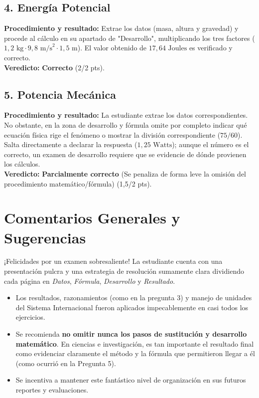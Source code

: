 \documentclass[12pt,letterpaper]{article}
\begin{document}
\subsection*{4. Energía Potencial}
\textbf{Procedimiento y resultado:} Extrae los datos (masa, altura y gravedad) y procede al cálculo en su apartado de "Desarrollo", multiplicando los tres factores ($1,2 \text{ kg} \cdot 9,8 \text{ m/s}^2 \cdot 1,5 \text{ m}$). El valor obtenido de $17,64 \text{ Joules}$ es verificado y correcto. \\
\textbf{Veredicto:} \textbf{Correcto} (2/2 pts).

\subsection*{5. Potencia Mecánica}
\textbf{Procedimiento y resultado:} La estudiante extrae los datos correspondientes. No obstante, en la zona de desarrollo y fórmula omite por completo indicar qué ecuación física rige el fenómeno o mostrar la división correspondiente ($75 / 60$). Salta directamente a declarar la respuesta ($1,25 \text{ Watts}$); aunque el número es el correcto, un examen de desarrollo requiere que se evidencie de dónde provienen los cálculos. \\
\textbf{Veredicto:} \textbf{Parcialmente correcto} (Se penaliza de forma leve la omisión del procedimiento matemático/fórmula) (1,5/2 pts).

\vspace{0.5cm}
\section*{Comentarios Generales y Sugerencias}
¡Felicidades por un examen sobresaliente! La estudiante cuenta con una presentación pulcra y una estrategia de resolución sumamente clara dividiendo cada página en \textit{Datos}, \textit{Fórmula}, \textit{Desarrollo} y \textit{Resultado}.
\begin{itemize}
    \item Los resultados, razonamientos (como en la pregunta 3) y manejo de unidades del Sistema Internacional fueron aplicados impecablemente en casi todos los ejercicios.
    \item Se recomienda \textbf{no omitir nunca los pasos de sustitución y desarrollo matemático}. En ciencias e investigación, es tan importante el resultado final como evidenciar claramente el método y la fórmula que permitieron llegar a él (como ocurrió en la Pregunta 5).
    \item Se incentiva a mantener este fantástico nivel de organización en sus futuros reportes y evaluaciones.
\end{itemize}
\end{document}
